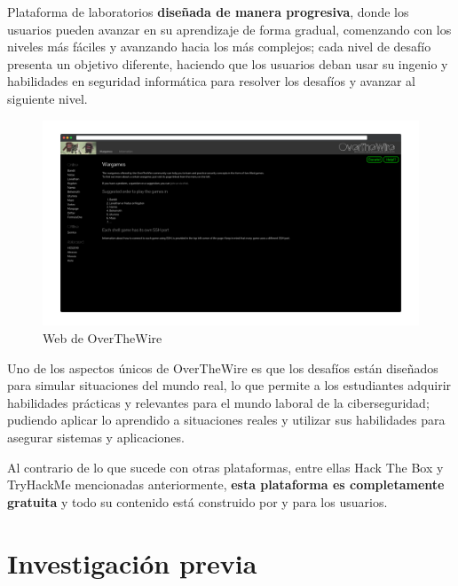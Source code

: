         Plataforma de laboratorios \textbf{diseñada de manera progresiva}, donde los usuarios pueden avanzar en su aprendizaje de forma gradual, comenzando con los niveles más fáciles y avanzando hacia los más complejos; cada nivel de desafío presenta un objetivo diferente, haciendo que los usuarios deban usar su ingenio y habilidades en seguridad informática para resolver los desafíos y avanzar al siguiente nivel.
        
        \begin{figure}[h]
            \centering
            \includegraphics[width=\textwidth]{images/Capturas/Web de OverTheWire.png}
            \caption{Web de OverTheWire}
            \label{fig:OverTheWire-web}
        \end{figure}
        
        Uno de los aspectos únicos de OverTheWire es que los desafíos están diseñados para simular situaciones del mundo real, lo que permite a los estudiantes adquirir habilidades prácticas y relevantes para el mundo laboral de la ciberseguridad; pudiendo aplicar lo aprendido a situaciones reales y utilizar sus habilidades para asegurar sistemas y aplicaciones.
        
        Al contrario de lo que sucede con otras plataformas, entre ellas Hack The Box y TryHackMe mencionadas anteriormente, \textbf{esta plataforma es completamente gratuita} y todo su contenido está construido por y para los usuarios.
        
        \cleardoublepage
    
    

\chapter{Investigación previa}
    \label{cap:investigacion-previa}
    

